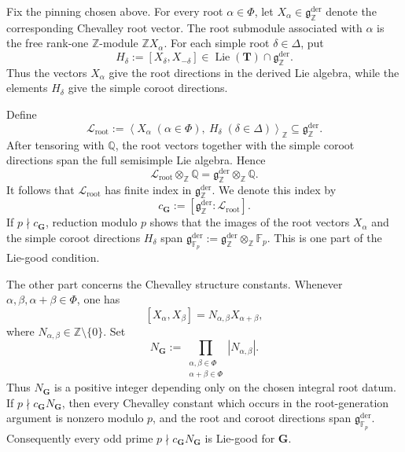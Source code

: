 \documentclass[11pt]{amsart}
\numberwithin{equation}{section}
\newcommand{\Q}{\mathbb Q}
\newcommand{\Z}{\mathbb Z}
\newcommand{\Fp}{\mathbb F_p}
\newcommand{\frakg}{\mathfrak g}
\newcommand{\GG}{\mathbf G}
\newcommand{\TT}{\mathbf T}
\newcommand{\Lie}{\operatorname{Lie}}
\theoremstyle{definition}
\begin{document}
\par Fix the pinning chosen above. For every root
$\alpha\in\Phi$, let $X_\alpha\in\frakg_{\Z}^{\mathrm{der}}$ denote the corresponding Chevalley root vector. The root submodule
associated with $\alpha$ is the free rank-one $\Z$-module
$\Z X_\alpha$. For each simple root $\delta\in\Delta$, put
\[
        H_\delta
        :=
        [X_\delta,X_{-\delta}]
        \in
        \Lie(\TT)\cap\frakg_{\Z}^{\mathrm{der}}.
\]
Thus the vectors $X_\alpha$ give the root directions in the derived
Lie algebra, while the elements $H_\delta$ give the simple coroot
directions.

\par Define
\[
        \mathcal L_{\mathrm{root}}
        :=
        \left\langle
        X_\alpha\;(\alpha\in\Phi),
        \ H_\delta\;(\delta\in\Delta)
        \right\rangle_{\Z}
        \subseteq
        \frakg_{\Z}^{\mathrm{der}}.
\]
After tensoring with $\Q$, the root vectors together with the simple
coroot directions span the full semisimple Lie algebra. Hence
\[
        \mathcal L_{\mathrm{root}}\otimes_{\Z}\Q
        =
        \frakg_{\Z}^{\mathrm{der}}\otimes_{\Z}\Q.
\]
It follows that $\mathcal L_{\mathrm{root}}$ has finite index in
$\frakg_{\Z}^{\mathrm{der}}$. We denote this index by
\[
        c_{\GG}
        :=
        \left[
        \frakg_{\Z}^{\mathrm{der}}:
        \mathcal L_{\mathrm{root}}
        \right].
\]
If $p\nmid c_{\GG}$, reduction modulo $p$ shows that the images of the
root vectors $X_\alpha$ and the simple coroot directions $H_\delta$
span $\frakg_{\Fp}^{\mathrm{der}}
        :=
        \frakg_{\Z}^{\mathrm{der}}\otimes_{\Z}\Fp$. This is one part of the Lie-good condition.

\par The other part concerns the Chevalley structure constants. Whenever
$\alpha,\beta,\alpha+\beta\in\Phi$, one has
\[
        [X_\alpha,X_\beta]
        =
        N_{\alpha,\beta}X_{\alpha+\beta},
\]
where $N_{\alpha,\beta}\in\Z\setminus\{0\}$. Set
\[
        N_{\GG}
        :=
        \prod_{\substack{\alpha,\beta\in\Phi\\
                          \alpha+\beta\in\Phi}}
        |N_{\alpha,\beta}|.
\]
Thus $N_{\GG}$ is a positive integer depending only on the chosen
integral root datum. If $p\nmid c_{\GG}N_{\GG}$, then every Chevalley constant which occurs in the root-generation
argument is nonzero modulo $p$, and the root and coroot directions
span $\frakg_{\Fp}^{\mathrm{der}}$. Consequently every odd prime
$p\nmid c_{\GG}N_{\GG}$ is Lie-good for $\GG$.
\end{document}
